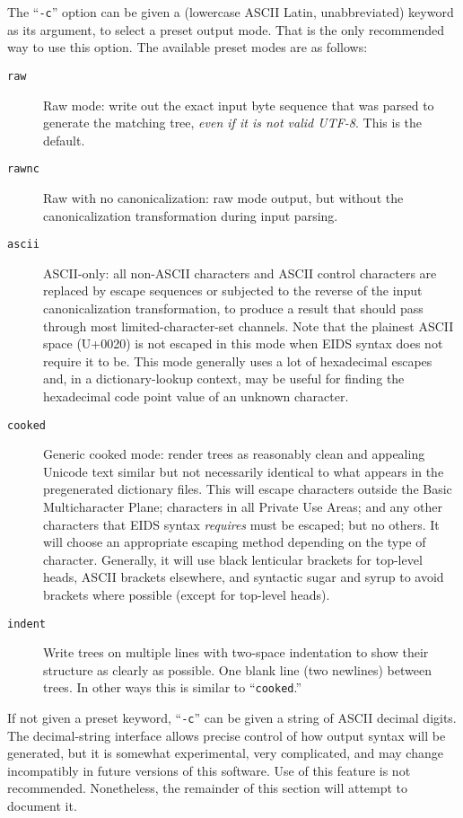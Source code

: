 \documentclass[twocolumn]{report}
\begin{document}
The ``\texttt{-c}'' option can be given a (lowercase ASCII Latin,
unabbreviated) keyword as
its argument, to select a preset output mode.  That is the only recommended
way to use this option.  The available preset modes are as follows:
\begin{description}
  \item[\texttt{raw}] Raw mode: write out the exact input byte sequence
    that was parsed to generate the matching tree, \emph{even if it is not
    valid UTF-8}.  This is the default.
  \item[\texttt{rawnc}] Raw with no canonicalization: raw mode output,
    but without the canonicalization transformation during input parsing.
  \item[\texttt{ascii}] ASCII-only: all non-ASCII characters and ASCII
    control characters are replaced by escape sequences or subjected to
    the reverse of the input canonicalization transformation, to produce a
    result that should pass through most limited-character-set channels. 
    Note that the plainest ASCII space (U+0020) is not escaped in this mode
    when EIDS syntax does not require it to be.  This mode generally uses a
    lot of hexadecimal escapes and, in a dictionary-lookup context, may be
    useful for finding the hexadecimal code point value of an unknown
    character.
  \item[\texttt{cooked}] Generic cooked mode: render trees as reasonably
    clean and appealing Unicode text similar but not necessarily identical
    to what appears in the pregenerated dictionary files.  This will escape
    characters outside the Basic Multicharacter Plane; characters in all
    Private Use Areas; and any other characters that EIDS syntax
    \emph{requires} must be escaped; but no others.  It will choose an
    appropriate escaping method depending on the type of character. 
    Generally, it will use black lenticular brackets for top-level heads,
    ASCII brackets elsewhere, and syntactic sugar and syrup to avoid
    brackets where possible (except for top-level heads).
  \item[\texttt{indent}] Write trees on multiple lines with two-space
    indentation to show their structure as clearly as possible.  One blank
    line (two newlines) between trees.  In other ways this is similar to
    ``\texttt{cooked}.''
\end{description}

If not given a preset keyword, ``\texttt{-c}'' can be given a string of
ASCII decimal digits.  The decimal-string interface allows precise control
of how output syntax will be generated, but it is somewhat experimental,
very complicated, and may change incompatibly in future versions of this
software.  Use of this feature is not recommended.  Nonetheless, the
remainder of this section will attempt to document it.
\end{document}
